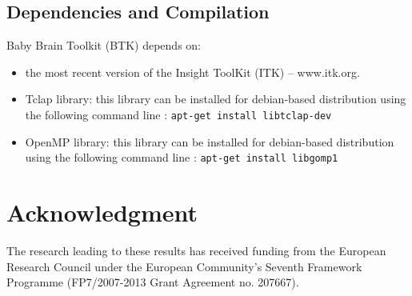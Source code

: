 \documentclass[a4paper,10pt,draft]{article}
\begin{document}
\subsection{Dependencies and Compilation}
Baby Brain Toolkit (BTK) depends on:
\begin{itemize}
 \item the most recent version of the Insight ToolKit (ITK) -- www.itk.org. 
 \item Tclap library: this library can be installed for debian-based distribution using the following command line : \texttt{apt-get install libtclap-dev}
 \item OpenMP library: this library can be installed for debian-based distribution using the following command line : \texttt{apt-get install libgomp1}
\end{itemize}






\section*{Acknowledgment}
\small{The research leading to these results has received funding from the European Research Council under the European Community’s Seventh Framework Programme (FP7/2007-2013 Grant Agreement no. 207667).}
\end{document}
